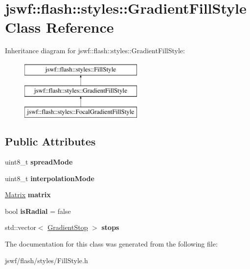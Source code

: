 \hypertarget{classjswf_1_1flash_1_1styles_1_1_gradient_fill_style}{\section{jswf\+:\+:flash\+:\+:styles\+:\+:Gradient\+Fill\+Style Class Reference}
\label{classjswf_1_1flash_1_1styles_1_1_gradient_fill_style}
}
Inheritance diagram for jswf\+:\+:flash\+:\+:styles\+:\+:Gradient\+Fill\+Style\+:\begin{figure}[H]
\begin{center}
\leavevmode
\includegraphics[height=3.000000cm]{classjswf_1_1flash_1_1styles_1_1_gradient_fill_style}
\end{center}
\end{figure}
\subsection*{Public Attributes}
\begin{DoxyCompactItemize}
\item 
\hypertarget{classjswf_1_1flash_1_1styles_1_1_gradient_fill_style_a2cb7b9a0548773fa84c81bee49c63082}{uint8\+\_\+t {\bfseries spread\+Mode}}\label{classjswf_1_1flash_1_1styles_1_1_gradient_fill_style_a2cb7b9a0548773fa84c81bee49c63082}

\item 
\hypertarget{classjswf_1_1flash_1_1styles_1_1_gradient_fill_style_aafed92563fe46687c170e78a06ef501f}{uint8\+\_\+t {\bfseries interpolation\+Mode}}\label{classjswf_1_1flash_1_1styles_1_1_gradient_fill_style_aafed92563fe46687c170e78a06ef501f}

\item 
\hypertarget{classjswf_1_1flash_1_1styles_1_1_gradient_fill_style_a79886d8ef621456a790c8489248e5087}{\hyperlink{structjswf_1_1flash_1_1_matrix}{Matrix} {\bfseries matrix}}\label{classjswf_1_1flash_1_1styles_1_1_gradient_fill_style_a79886d8ef621456a790c8489248e5087}

\item 
\hypertarget{classjswf_1_1flash_1_1styles_1_1_gradient_fill_style_a2700c16bb045c3ff52ca3f11c4dda30b}{bool {\bfseries is\+Radial} = false}\label{classjswf_1_1flash_1_1styles_1_1_gradient_fill_style_a2700c16bb045c3ff52ca3f11c4dda30b}

\item 
\hypertarget{classjswf_1_1flash_1_1styles_1_1_gradient_fill_style_a40285054cf588f639af30500aa4067ce}{std\+::vector$<$ \hyperlink{structjswf_1_1flash_1_1styles_1_1_gradient_stop}{Gradient\+Stop} $>$ {\bfseries stops}}\label{classjswf_1_1flash_1_1styles_1_1_gradient_fill_style_a40285054cf588f639af30500aa4067ce}

\end{DoxyCompactItemize}


The documentation for this class was generated from the following file\+:\begin{DoxyCompactItemize}
\item 
jswf/flash/styles/Fill\+Style.\+h\end{DoxyCompactItemize}
